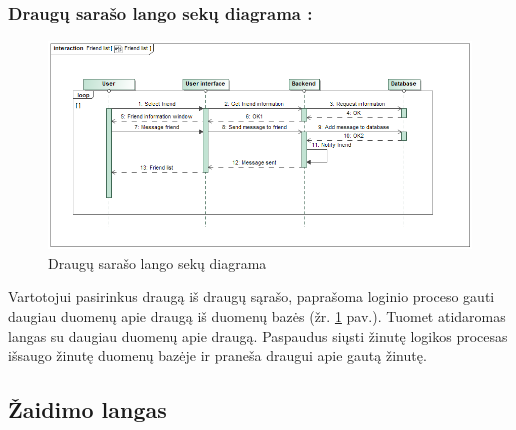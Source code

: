 \documentclass{VUMIFPSkursinis}
\begin{document}
		\subsubsection*{Draugų sarašo lango sekų diagrama :}
			\begin{figure}[H]
				\centering
				\includegraphics[scale=0.5]{img/FriendList_sequence}
				\caption{Draugų sarašo lango sekų diagrama}
				\label{img:FriendList_sequence}
			\end{figure}
			Vartotojui pasirinkus draugą iš draugų sąrašo, paprašoma loginio proceso
			gauti daugiau duomenų apie draugą iš duomenų bazės (žr. \ref{img:FriendList_sequence} pav.). Tuomet atidaromas 
			langas su daugiau duomenų apie draugą. Paspaudus siųsti žinutę logikos 
			procesas išsaugo žinutę duomenų bazėje ir praneša draugui apie gautą žinutę.
			
	\subsection{Žaidimo langas}		
\end{document}
